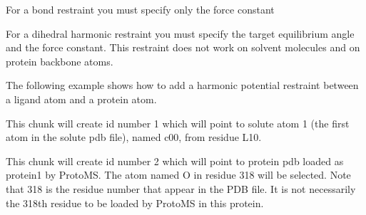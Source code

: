 \documentclass[letterpaper,10pt,english]{sphinxmanual}
\begin{document}
\ignorespaces 
\def\sphinxLiteralBlockLabel{\label{\detokenize{protoms:index-78}}}
%
\begin{sphinxVerbatim}[commandchars=\\\{\}]
      
\end{sphinxVerbatim}

For a bond restraint you must specify only the force constant

\ignorespaces 
\def\sphinxLiteralBlockLabel{\label{\detokenize{protoms:index-79}}}
%
\begin{sphinxVerbatim}[commandchars=\\\{\}]
       
\end{sphinxVerbatim}

For a dihedral harmonic restraint you must specify the target equilibrium angle and the force constant. This restraint does not work on solvent molecules and on protein backbone atoms.

The following example shows how to add a harmonic potential restraint between a ligand atom and a protein atom.

%
\begin{sphinxVerbatim}[commandchars=\\\{\}]
       
\end{sphinxVerbatim}

This chunk will create id number 1 which will point to solute atom 1 (the first atom in the solute pdb file), named c00, from residue L10.

%
\begin{sphinxVerbatim}[commandchars=\\\{\}]
       
\end{sphinxVerbatim}

This chunk will create id number 2 which will point to protein pdb loaded as protein1 by ProtoMS. The atom named O in residue 318 will be selected. Note that 318 is the residue number that appear in the PDB file. It is not necessarily the 318th residue to be loaded by ProtoMS in this protein.
\end{document}
